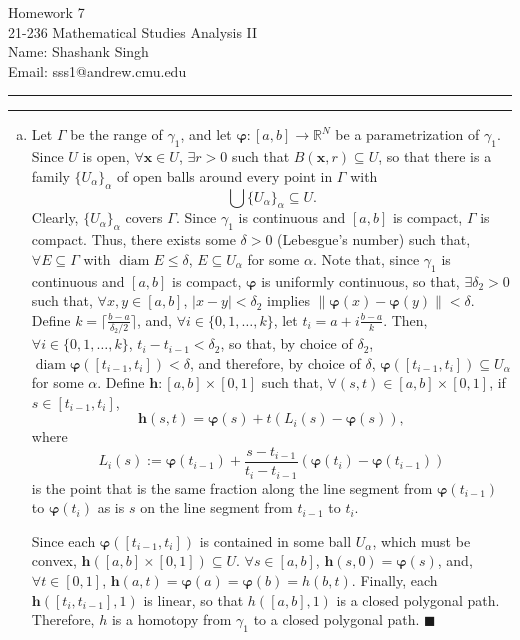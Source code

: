 \documentclass[11pt]{article}
\makeatletter
\newcounter{questionCounter}
\newcounter{partCounter}[questionCounter]
\newenvironment{question}[2][\arabic{questionCounter}]{%
    \setcounter{partCounter}{0}%
    \vspace{.25in} \hrule \vspace{0.5em}%
        \noindent{\bf #2}%
    \vspace{0.8em} \hrule \vspace{.10in}%
    \addtocounter{questionCounter}{1}%
}{}
\newcommand{\myname}{Shashank Singh}
\newcommand{\myandrew}{sss1@andrew.cmu.edu}
\newcommand{\myclass}{21-236 Mathematical Studies Analysis II}
\newcommand{\myhwnum}{7}
\renewcommand{\qed}{\quad $\blacksquare$}
\newcommand{\bvarphi}{\boldsymbol{\varphi}}
\newcommand{\diam}{\operatorname{diam}}
\newcommand{\bfh}{\mathbf{h}}
\makeatother
\begin{document}
\thispagestyle{plain}

{\Large Homework \myhwnum} \\
\myclass \\
Name: \myname \\
Email: \myandrew \\

\begin{question}{Problem 1}
\begin{enumerate}[(a)]
\item Let $\Gamma$ be the range of $\gamma_1$, and let
$\bvarphi: [a,b] \rightarrow \mathbb{R}^N$ be a parametrization of $\gamma_1$.
Since $U$ is open, $\forall \mathbf{x} \in U$, $\exists r > 0$ such that
$B(\mathbf{x},r) \subseteq U$, so that there is a family
$\{U_{\alpha}\}_{\alpha}$ of open balls around every point in $\Gamma$ with
\[\bigcup \{U_{\alpha}\}_{\alpha} \subseteq U.\] Clearly,
$\{U_{\alpha}\}_{\alpha}$ covers $\Gamma$. Since $\gamma_1$ is continuous and
$[a,b]$ is compact, $\Gamma$ is compact. Thus, there
exists some $\delta > 0$ (Lebesgue's number) such that,
$\forall E \subseteq \Gamma$ with $\diam E \leq \delta$,
$E \subseteq U_{\alpha}$ for some $\alpha$.
Note that, since $\gamma_1$ is continuous and $[a,b]$ is compact, $\bvarphi$
is uniformly continuous, so that, $\exists \delta_2 > 0$ such that,
$\forall x,y \in [a,b]$, $|x - y| < \delta_2$ implies
$\|\bvarphi(x) - \bvarphi(y)\| < \delta$. Define
$k = \lceil\frac{b - a}{\delta_2/2}\rceil$, and,
$\forall i \in \{0,1,\ldots,k\}$, let $t_i = a + i\frac{b - a}{k}$.
Then, $\forall i \in \{0,1,\ldots,k\}$, $t_i - t_{i - 1} < \delta_2$, so that,
by choice of $\delta_2$, $\diam \bvarphi([t_{i - 1},t_i]) < \delta$, and
therefore, by choice of $\delta$,
$\bvarphi([t_{i - 1},t_i]) \subseteq U_{\alpha}$ for some $\alpha$.
Define $\bfh: [a,b] \times [0,1]$ such that,
$\forall (s,t) \in [a,b] \times [0,1]$, if $s \in [t_{i - 1},t_i]$,
\[\bfh(s,t) = \bvarphi(s) + t(L_i(s) - \bvarphi(s)),\]
where
\[L_i(s) := \bvarphi(t_{i - 1}) + \frac{s - t_{i - 1}}{t_i - t_{i - 1}}(\bvarphi(t_{i}) - \bvarphi(t_{i - 1}))\]
is the point that is the same fraction along the line segment from
$\bvarphi(t_{i -1})$ to $\bvarphi(t_i)$ as is $s$ on the line segment from
$t_{i - 1}$ to $t_i$.

Since each $\bvarphi([t_{i - 1},t_i])$ is contained in some ball $U_{\alpha}$,
which must be convex, $\bfh([a,b] \times [0,1]) \subseteq U$.
$\forall s \in [a,b]$, $\bfh(s,0) = \bvarphi(s)$, and, $\forall t \in [0,1]$,
$\bfh(a,t) = \bvarphi(a) = \bvarphi(b) = h(b,t)$. Finally, each
$\bfh([t_i,t_{i - 1}],1)$ is linear, so that $h([a,b],1)$ is a closed polygonal
path. Therefore, $h$ is a homotopy from $\gamma_1$ to a closed polygonal path.
\qed


\end{enumerate}
\end{question}
\end{document}
